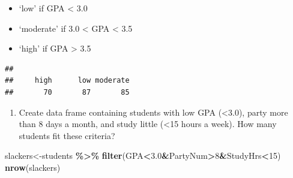\documentclass[
  openany]{book}
\newenvironment{Shaded}{\begin{snugshade}}{\end{snugshade}}
\newcommand{\AttributeTok}[1]{\textcolor[rgb]{0.13,0.29,0.53}{#1}}
\newcommand{\DecValTok}[1]{\textcolor[rgb]{0.00,0.00,0.81}{#1}}
\newcommand{\FloatTok}[1]{\textcolor[rgb]{0.00,0.00,0.81}{#1}}
\newcommand{\FunctionTok}[1]{\textcolor[rgb]{0.13,0.29,0.53}{\textbf{#1}}}
\newcommand{\NormalTok}[1]{#1}
\newcommand{\OtherTok}[1]{\textcolor[rgb]{0.56,0.35,0.01}{#1}}
\newcommand{\SpecialCharTok}[1]{\textcolor[rgb]{0.81,0.36,0.00}{\textbf{#1}}}
\newcommand{\StringTok}[1]{\textcolor[rgb]{0.31,0.60,0.02}{#1}}
\providecommand{\tightlist}{%
  \setlength{\itemsep}{0pt}\setlength{\parskip}{0pt}}
\begin{document}
\begin{itemize}
\tightlist
\item
  `low' if GPA \textless{} 3.0
\item
  `moderate' if 3.0 \textless{} GPA \textless{} 3.5
\item
  `high' if GPA \textgreater{} 3.5
\end{itemize}

\begin{Shaded}
\end{Shaded}

\begin{verbatim}
## 
##     high      low moderate 
##       70       87       85
\end{verbatim}

\begin{enumerate}
\def\labelenumi{\arabic{enumi}.}
\setcounter{enumi}{7}
\tightlist
\item
  Create data frame containing students with low GPA (\textless3.0), party more than 8 days a month, and study little (\textless15 hours a week). How many students fit these criteria?
\end{enumerate}

\begin{Shaded}
\begin{Highlighting}[]
\NormalTok{slackers}\OtherTok{\textless{}{-}}\NormalTok{students }\SpecialCharTok{\%\textgreater{}\%} 
  \FunctionTok{filter}\NormalTok{(GPA}\SpecialCharTok{\textless{}}\FloatTok{3.0}\SpecialCharTok{\&}\NormalTok{PartyNum}\SpecialCharTok{\textgreater{}}\DecValTok{8}\SpecialCharTok{\&}\NormalTok{StudyHrs}\SpecialCharTok{\textless{}}\DecValTok{15}\NormalTok{)}
\FunctionTok{nrow}\NormalTok{(slackers)}
\end{Highlighting}
\end{Shaded}
\end{document}
